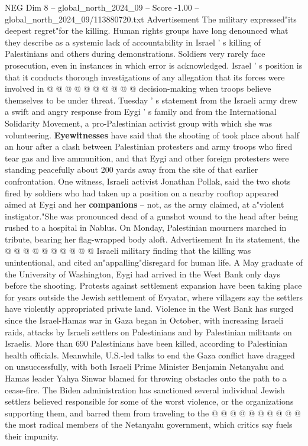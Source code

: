 \begin{textsample}{NEG Dim 8 – global\_north\_2024\_09 – Score -1.00 – global\_north\_2024\_09/113880720.txt}
Advertisement The military expressed"its deepest regret"for the killing.
Human rights groups have long denounced what they describe as a systemic lack of accountability in Israel ' s killing of Palestinians and others during demonstrations.
Soldiers very rarely face prosecution, even in instances in which error is acknowledged.
Israel ' s position is that it conducts thorough investigations of any allegation that its forces were involved in @ @ @ @ @ @ @ @ @ @ decision-making when troops believe themselves to be under threat.
Tuesday ' s statement from the Israeli army drew a swift and angry response from Eygi ' s family and from the International Solidarity Movement, a pro-Palestinian activist group with which she was volunteering. \textbf{Eyewitnesses} have said that the shooting of took place about half an hour after a clash between Palestinian protesters and army troops who fired tear gas and live ammunition, and that Eygi and other foreign protesters were standing peacefully about 200 yards away from the site of that earlier confrontation.
One witness, Israeli activist Jonathan Pollak, said the two shots fired by soldiers who had taken up a position on a nearby rooftop appeared aimed at Eygi and her \textbf{companions} -- not, as the army claimed, at a"violent instigator."She was pronounced dead of a gunshot wound to the head after being rushed to a hospital in Nablus.
On Monday, Palestinian mourners marched in tribute, bearing her flag-wrapped body aloft.
Advertisement In its statement, the @ @ @ @ @ @ @ @ @ @ Israeli military finding that the killing was unintentional, and cited an"appalling"disregard for human life.
A May graduate of the University of Washington, Eygi had arrived in the West Bank only days before the shooting.
Protests against settlement expansion have been taking place for years outside the Jewish settlement of Evyatar, where villagers say the settlers have violently appropriated private land.
Violence in the West Bank has surged since the Israel-Hamas war in Gaza began in October, with increasing Israeli raids, attacks by Israeli settlers on Palestinians and by Palestinian militants on Israelis.
More than 690 Palestinians have been killed, according to Palestinian health officials.
Meanwhile, U.S.-led talks to end the Gaza conflict have dragged on unsuccessfully, with both Israeli Prime Minister Benjamin Netanyahu and Hamas leader Yahya Sinwar blamed for throwing obstacles onto the path to a cease-fire.
The Biden administration has sanctioned several individual Jewish settlers believed responsible for some of the worst violence, or the organizations supporting them, and barred them from traveling to the @ @ @ @ @ @ @ @ @ @ the most radical members of the Netanyahu government, which critics say fuels their impunity.

\end{textsample}
